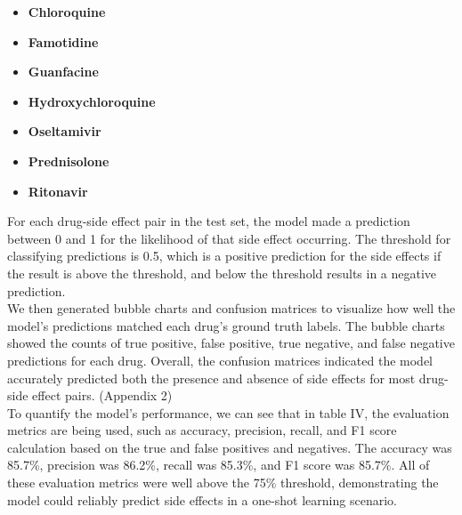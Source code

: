 \documentclass[conference]{IEEEtran}
\begin{document}
\begin{itemize}
  \item \textbf{Chloroquine} 
  \item \textbf{Famotidine} 
  \item \textbf{Guanfacine} 
  \item \textbf{Hydroxychloroquine}
  \item \textbf{Oseltamivir}
  \item \textbf{Prednisolone}
  \item \textbf{Ritonavir}
\end{itemize}

For each drug-side effect pair in the test set, the model made a prediction between 0 and 1 for the likelihood of that side effect occurring. The threshold for classifying predictions is 0.5, which is a positive prediction for the side effects if the result is above the threshold, and below the threshold results in a negative prediction.\\

We then generated bubble charts and confusion matrices to visualize how well the model's predictions matched each drug's ground truth labels. The bubble charts showed the counts of true positive, false positive, true negative, and false negative predictions for each drug. Overall, the confusion matrices indicated the model accurately predicted both the presence and absence of side effects for most drug-side effect pairs. (Appendix 2)\\

To quantify the model's performance, we can see that in table IV, the evaluation metrics are being used, such as accuracy, precision, recall, and F1 score calculation based on the true and false positives and negatives. The accuracy was 85.7\%, precision was 86.2\%, recall was 85.3\%, and F1 score was 85.7\%. All of these evaluation metrics were well above the 75\% threshold, demonstrating the model could reliably predict side effects in a one-shot learning scenario.
\end{document}
